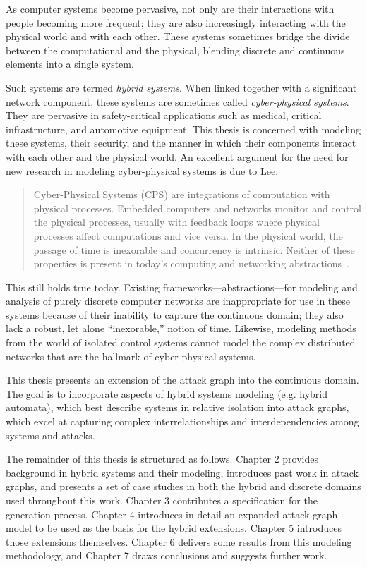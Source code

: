 As computer systems become pervasive, not only are 
their interactions with people becoming more frequent; they are also
increasingly interacting with the physical world and with each other. These
systems sometimes bridge the divide between the computational and the physical,
blending discrete and continuous elements into a single system.

Such systems are termed \emph{hybrid systems}. When linked together with a 
significant network component, these systems are sometimes called
\emph{cyber-physical systems}. They are pervasive in 
safety-critical applications such as medical, critical infrastructure, and
automotive equipment. This thesis is concerned with modeling
these systems, their security, and the manner in which their components
interact with each other and the physical world.
An excellent argument for the need for new research in modeling cyber-physical 
systems is due to Lee:
\begin{quote}
Cyber-Physical Systems (CPS) are integrations of computation with physical
processes. Embedded computers and networks monitor and control the physical
processes, usually with feedback loops where physical processes affect computations 
and vice versa. In the physical world, the passage of time is inexorable
and concurrency is intrinsic. Neither of these properties is present in today's
computing and networking abstractions~\cite{lee2006cyber}.
\end{quote}

This still holds true today. Existing frameworks---abstractions---for modeling 
and analysis of purely discrete computer networks are inappropriate for use in
these systems because of their inability to capture the continuous domain; they
also lack a robust, let alone ``inexorable,'' notion of time. Likewise, 
modeling methods from the world of isolated control systems cannot model the
complex distributed networks that are the hallmark of cyber-physical systems.

This thesis presents an extension of the attack graph into the 
continuous domain. 
The goal is to incorporate aspects of hybrid systems
modeling (e.g. hybrid automata), which best describe systems in 
relative isolation into attack graphs, which excel at capturing complex 
interrelationships and interdependencies among systems and attacks.

The remainder of this thesis is structured as follows. Chapter 2 provides 
background in hybrid systems and their modeling, introduces past work in attack 
graphs, and presents a set of case studies in both the hybrid and discrete 
domains used throughout this work. Chapter 3 contributes a specification for 
the generation process. Chapter 4 introduces in detail an expanded attack graph 
model to be used as the basis for the hybrid extensions. Chapter 5
introduces those extensions themselves. Chapter 6 delivers some results from 
this modeling methodology, and Chapter 7 draws conclusions and suggests 
further work.
